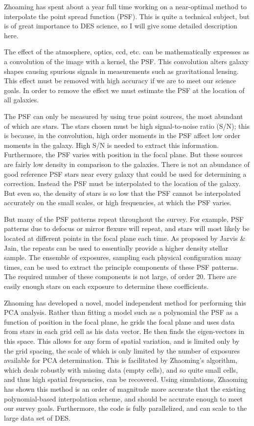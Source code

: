 \documentclass[12pt]{letter}
\begin{document}
Zhoaming has spent about a year full time working on a near-optimal method to
interpolate the point spread function (PSF).  This is quite a technical
subject, but is of great importance to DES science, so I will give some
detailed description here.

The effect of the atmosphere, optics, ccd, etc. can be mathematically expresses
as a convolution of the image with a kernel, the PSF.  This convolution alters
galaxy shapes causing spurious signals in measurements such as gravitational
lensing.  This effect must be removed with high accuracy if we are to meet our
science goals.  In order to remove the effect we must estimate the PSF at the
location of all galaxies.

The PSF can only be measured by using true point sources, the most abundant of
which are stars.  The stars chosen must be high signal-to-noise ratio (S/N);
this is because, in the convolution, high order moments in the PSF affect low
order moments in the galaxy.  High S/N is needed to extract this information.
Furthermore, the PSF varies with position in the focal plane.  But these
sources are fairly low density in comparison to the galaxies.   There is not an
abundance of good reference PSF stars near every galaxy that could be used for
determining a correction.  Instead the PSF must be interpolated to the location
of the galaxy.  But even so, the density of stars is so low that the PSF cannot
be interpolated accurately on the small scales, or high frequencies, at which the
PSF varies. 

But many of the PSF patterns repeat throughout the survey.  For example, PSF
patterns due to defocus or mirror flexure will repeat, and stars will most
likely be located at different points in the focal plane each time.  As
proposed by Jarvis \& Jain, the repeats can be used to essentially provide a
higher density stellar sample.  The ensemble of exposures, sampling each
physical configuration many times, can be used to extract the principle
components of these PSF patterns.  The required number of these components is
not large, of order 20.  There are easily enough stars on each exposure to
determine these coefficients.  

Zhaoming has developed a novel, model independent method for performing this
PCA analysis.  Rather than fitting a model such as a polynomial the PSF as a
function of position in the focal plane, he grids the focal plane and uses data
from stars in each grid cell as his data vector.  He then finds the
eigen-vectors in this space.  This allows for any form of spatial variation,
and is limited only by the grid spacing, the scale of which is only limited by
the number of exposures available for PCA determination.  This is facilitated
by Zhaoming's algorithm, which deals robustly with missing data (empty cells),
and so quite small cells, and thus high spatial frequencies, can be recovered.
Using simulations, Zhaoming has shown this method is an order of magnitude more
accurate that the existing polynomial-based interpolation scheme, and should be
accurate enough to meet our survey goals.  Furthermore, the code is fully
parallelized, and can scale to the large data set of DES.
\end{document}
